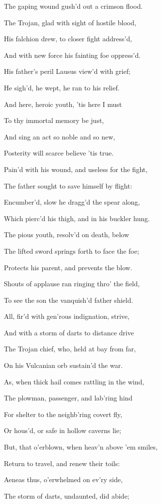 The gaping wound gush’d out a crimson flood.

The Trojan, glad with sight of hostile blood,

His falchion drew, to closer fight address’d,

And with new force his fainting foe oppress’d.

His father’s peril Lausus view’d with grief;

He sigh’d, he wept, he ran to his relief.

And here, heroic youth, ’tis here I must

To thy immortal memory be just,

And sing an act so noble and so new,

Posterity will scarce believe ’tis true.

Pain’d with his wound, and useless for the fight,

The father sought to save himself by flight:

Encumber’d, slow he dragg’d the spear along,

Which pierc’d his thigh, and in his buckler hung.

The pious youth, resolv’d on death, below

The lifted sword springs forth to face the foe;

Protects his parent, and prevents the blow.

Shouts of applause ran ringing thro’ the field,

To see the son the vanquish’d father shield.

All, fir’d with gen’rous indignation, strive,

And with a storm of darts to distance drive

The Trojan chief, who, held at bay from far,

On his Vulcanian orb sustain’d the war.

As, when thick hail comes rattling in the wind,

The plowman, passenger, and lab’ring hind

For shelter to the neighb’ring covert fly,

Or hous’d, or safe in hollow caverns lie;

But, that o’erblown, when heav’n above ’em smiles,

Return to travel, and renew their toils:

Aeneas thus, o’erwhelmed on ev’ry side,

The storm of darts, undaunted, did abide;

